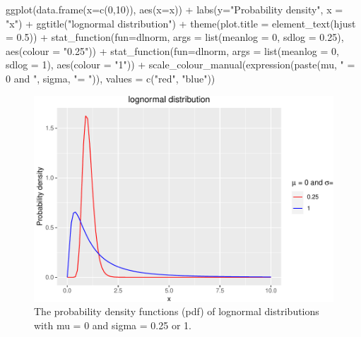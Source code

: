 \documentclass[landscape, 20pt]{extreport}
\newenvironment{Shaded}{\begin{snugshade}}{\end{snugshade}}
\newcommand{\AttributeTok}[1]{\textcolor[rgb]{0.77,0.63,0.00}{#1}}
\newcommand{\DecValTok}[1]{\textcolor[rgb]{0.00,0.00,0.81}{#1}}
\newcommand{\FloatTok}[1]{\textcolor[rgb]{0.00,0.00,0.81}{#1}}
\newcommand{\FunctionTok}[1]{\textcolor[rgb]{0.00,0.00,0.00}{#1}}
\newcommand{\NormalTok}[1]{#1}
\newcommand{\SpecialCharTok}[1]{\textcolor[rgb]{0.00,0.00,0.00}{#1}}
\newcommand{\StringTok}[1]{\textcolor[rgb]{0.31,0.60,0.02}{#1}}
\theoremstyle{definition}
\theoremstyle{definition}
\theoremstyle{definition}
\theoremstyle{definition}
\theoremstyle{remark}
\begin{document}
\begin{Shaded}
\begin{Highlighting}[]
\FunctionTok{ggplot}\NormalTok{(}\FunctionTok{data.frame}\NormalTok{(}\AttributeTok{x=}\FunctionTok{c}\NormalTok{(}\DecValTok{0}\NormalTok{,}\DecValTok{10}\NormalTok{)), }\FunctionTok{aes}\NormalTok{(}\AttributeTok{x=}\NormalTok{x)) }\SpecialCharTok{+}
  \FunctionTok{labs}\NormalTok{(}\AttributeTok{y=}\StringTok{"Probability density"}\NormalTok{, }\AttributeTok{x =} \StringTok{"x"}\NormalTok{) }\SpecialCharTok{+} 
  \FunctionTok{ggtitle}\NormalTok{(}\StringTok{"lognormal distribution"}\NormalTok{)  }\SpecialCharTok{+}
  \FunctionTok{theme}\NormalTok{(}\AttributeTok{plot.title =} \FunctionTok{element\_text}\NormalTok{(}\AttributeTok{hjust =} \FloatTok{0.5}\NormalTok{)) }\SpecialCharTok{+}
  \FunctionTok{stat\_function}\NormalTok{(}\AttributeTok{fun=}\NormalTok{dlnorm, }\AttributeTok{args =} \FunctionTok{list}\NormalTok{(}\AttributeTok{meanlog =} \DecValTok{0}\NormalTok{, }\AttributeTok{sdlog =} \FloatTok{0.25}\NormalTok{), }\FunctionTok{aes}\NormalTok{(}\AttributeTok{colour =} \StringTok{"0.25"}\NormalTok{)) }\SpecialCharTok{+}
  \FunctionTok{stat\_function}\NormalTok{(}\AttributeTok{fun=}\NormalTok{dlnorm, }\AttributeTok{args =} \FunctionTok{list}\NormalTok{(}\AttributeTok{meanlog =} \DecValTok{0}\NormalTok{, }\AttributeTok{sdlog =} \DecValTok{1}\NormalTok{), }\FunctionTok{aes}\NormalTok{(}\AttributeTok{colour =} \StringTok{"1"}\NormalTok{)) }\SpecialCharTok{+}
  \FunctionTok{scale\_colour\_manual}\NormalTok{(}\FunctionTok{expression}\NormalTok{(}\FunctionTok{paste}\NormalTok{(mu, }\StringTok{" = 0 and "}\NormalTok{, sigma, }\StringTok{"= "}\NormalTok{)), }\AttributeTok{values =} \FunctionTok{c}\NormalTok{(}\StringTok{"red"}\NormalTok{, }\StringTok{"blue"}\NormalTok{))}
\end{Highlighting}
\end{Shaded}

\begin{figure}
\centering
\includegraphics{FigLognormal-1.pdf}
\caption{\label{fig:FigLognormal}The probability density functions (pdf) of lognormal distributions with mu = 0 and sigma = 0.25 or 1.}
\end{figure}
\end{document}
